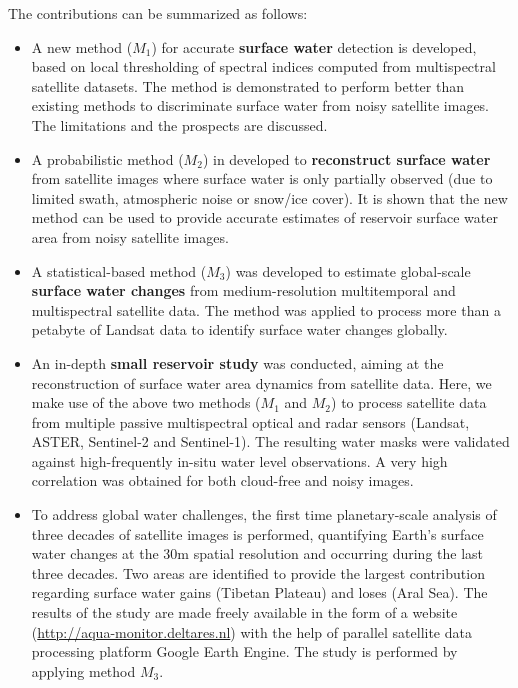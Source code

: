 The contributions can be summarized as follows:

\begin{itemize}
	\item A new method ($M_1$) for accurate \textbf{surface water} detection is developed, based on local thresholding of spectral indices computed from multispectral satellite datasets. The method is demonstrated to perform better than existing methods to discriminate surface water from noisy satellite images. The limitations and the prospects are discussed.
	
	\item A probabilistic method ($M_2$) in developed to \textbf{reconstruct surface water} from satellite images where surface water is only partially observed (due to limited swath, atmospheric noise or snow/ice cover). It is shown that the new method can be used to provide accurate estimates of reservoir surface water area from noisy satellite images.
	
	\item A statistical-based method ($M_3$) was developed to estimate global-scale \textbf{surface water changes} from medium-resolution multitemporal and multispectral satellite data. The method was applied to process more than a petabyte of Landsat data to identify surface water changes globally.
	
	\item An in-depth \textbf{small reservoir study} was conducted, aiming at the reconstruction of surface water area dynamics from satellite data. Here, we make use of the above two methods ($M_1$ and $M_2$)  to process satellite data from multiple passive multispectral optical and radar sensors (Landsat, ASTER, Sentinel-2 and Sentinel-1). The resulting water masks were validated against high-frequently in-situ water level observations. A very high correlation was obtained for both cloud-free and noisy images. 
	
	\item To address global water challenges, the first time planetary-scale analysis of three decades of satellite images is performed, quantifying Earth's surface water changes at the 30m spatial resolution and occurring during the last three decades. Two areas are identified to provide the largest contribution regarding surface water gains (Tibetan Plateau) and loses (Aral Sea). The results of the study are made freely available in the form of a website (\url{http://aqua-monitor.deltares.nl}) with the help of parallel satellite data processing platform Google Earth Engine. The study is performed by applying method $M_3$.
	

\end{itemize}
